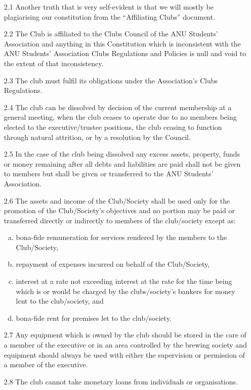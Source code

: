 \documentclass{article}
\begin{document}
\begin{enumerate}
    \item[2.1] Another truth that is very self-evident is that we will mostly be plagiarising our constitution from the “Affiliating Clubs” document.
    \item[2.2] The Club is affiliated to the Clubs Council of the ANU Students’ Association and anything in this Constitution which is inconsistent with the ANU Students’ Association Clubs Regulations and Policies is null and void to the extent of that inconsistency.
    \item[2.3] The club must fulfil its obligations under the Association’s Clubs Regulations.
    \item[2.4] The club can be dissolved by decision of the current membership at a general meeting, when the club ceases to operate due to no members being elected to the executive/trustee positions, the club ceasing to function through natural attrition, or by a resolution by the Council. 
    \item[2.5] In the case of the club being dissolved any excess assets, property, funds or money remaining after all debts and liabilities are paid shall not be given to members but shall be given or transferred to the ANU Students’ Association.
    \item[2.6] The assets and income of the Club/Society shall be used only for the promotion of the Club/Society’s objectives and no portion may be paid or transferred directly or indirectly to members of the club/society except as:
    \begin{enumerate}[a.]
        \item bona-fide remuneration for services rendered by the members to the Club/Society,
        \item repayment of expenses incurred on behalf of the Club/Society,
        \item interest at a rate not exceeding interest at the rate for the time being which is or would be charged by the clubs/society’s bankers for money lent to the club/society, and
        \item bona-fide rent for premises let to the club/society.
    \end{enumerate}
    \item[2.7] Any equipment which is owned by the club should be stored in the care of a member of the executive or in an area controlled by the brewing society and equipment should always be used with either the supervision or permission of a member of the executive.
    \item[2.8] The club cannot take monetary loans from individuals or organisations. 
\end{enumerate}
\end{document}
